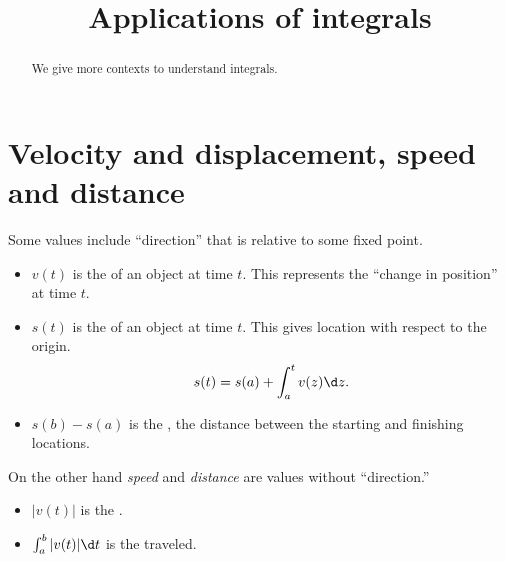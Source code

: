 \documentclass{ximera}
\title[Dig-In:]{Applications of integrals}
\begin{document}
\begin{abstract}
We give more contexts to understand integrals.
\end{abstract}
\maketitle



\section{Velocity and displacement, speed and distance}

Some values include ``direction'' that is relative to some fixed point.


  \begin{itemize}
  \item $v(t)$ is the  of an object at time $t$. This
    represents the ``change in position'' at time $t$.
  \item $s(t)$ is the  of an object at time $t$. This
    gives location with respect to the origin.     \[
    s(t) = s(a)+\int_a^t v(z) \d z.
    \]
  \item $s(b) -s(a)$ is the , the distance between the
    starting and finishing locations.
  \end{itemize}


On the other hand \textit{speed} and \textit{distance} are values
without ``direction.''


  \begin{itemize}
  \item $|v(t)|$ is the .
  \item $\int_a^b |v(t)| \d t$ is the  traveled.
  \end{itemize}
\end{document}

